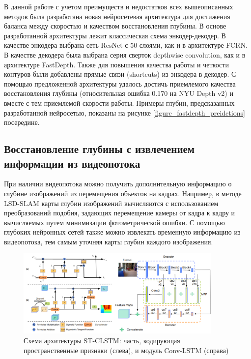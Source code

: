 \documentclass{mipt-thesis-ms}
\begin{document}
	В данной работе с учетом преимуществ и недостатков всех вышеописанных методов была разработана новая нейросетевая архитектура для достижения баланса между скоростью и качеством восстановления глубины. В основе разработанной архитектуры лежит классическая схема энкодер-декодер. В качестве энкодера выбрана сеть ResNet с 50 слоями, как и в архитектуре FCRN. В качестве декодера была выбрана серия сверток depthwise convolution, как и в архитектуре FastDepth. Также для повышения качества работы и четкости контуров были добавлены прямые связи (shortcuts) из энкодера в декодер. С помощью предложенной архитектуры удалось достичь приемлемого качества восстановления глубины (относительная ошибка 0.170 на NYU Depth v2) и вместе с тем приемлемой скорости работы. Примеры глубин, предсказанных разработанной нейросетью, показаны на рисунке \ref{figure_fastdepth_preidctions} посередине.
	
	\subsection{Восстановление глубины с извлечением информации из видеопотока}
	
	При наличии видеопотока можно получить дополнительную информацию о глубине изображений из перемещения объектов на кадрах. Например, в методе LSD-SLAM \cite{engel2014lsd} карты глубин изображений вычисляются с использованием преобразований подобия, задающих перемещение камеры от кадра к кадру и вычисляемых путем минимизации фотометрической ошибки. С помощью глубоких нейронных сетей также можно извлекать временную информацию из видеопотока, тем самым уточняя карты глубин каждого изображения.
	
	\begin{figure}
		\centering
		\includegraphics[width=0.9\textwidth]{img/st_clstm_scheme.png}
		\caption{Схема архитектуры ST-CLSTM: часть, кодирующая пространственные признаки (слева), и модуль Conv-LSTM (справа)}
		\label{figure_conv_lstm}
	\end{figure}
	
\end{document}
